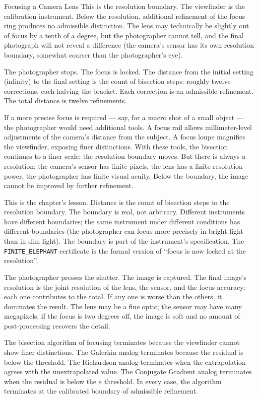 \begin{coda}{Focusing a Camera Lens}
This is the resolution boundary. The viewfinder is the
calibration instrument. Below the resolution, additional
refinement of the focus ring produces no admissible distinction.
The lens may technically be slightly out of focus by a tenth of
a degree, but the photographer cannot tell, and the final
photograph will not reveal a difference (the camera's sensor
has its own resolution boundary, somewhat coarser than the
photographer's eye).

The photographer stops. The focus is locked. The distance from
the initial setting (infinity) to the final setting is the
count of bisection steps: roughly twelve corrections, each
halving the bracket. Each correction is an admissible
refinement. The total distance is twelve refinements.

If a more precise focus is required --- say, for a macro shot
of a small object --- the photographer would need additional
tools. A focus rail allows millimeter-level adjustments of the
camera's distance from the subject. A focus loupe magnifies the
viewfinder, exposing finer distinctions. With these tools, the
bisection continues to a finer scale: the resolution boundary
moves. But there is always a resolution: the camera's sensor
has finite pixels, the lens has a finite resolution power, the
photographer has finite visual acuity. Below the boundary, the
image cannot be improved by further refinement.

This is the chapter's lesson. Distance is the count of
bisection steps to the resolution boundary. The boundary is
real, not arbitrary. Different instruments have different
boundaries; the same instrument under different conditions has
different boundaries (the photographer can focus more precisely
in bright light than in dim light). The boundary is part of
the instrument's specification. The
\texttt{FINITE\_ELEPHANT} certificate is the formal version of
``focus is now locked at the resolution''.

The photographer presses the shutter. The image is captured.
The final image's resolution is the joint resolution of the
lens, the sensor, and the focus accuracy: each one contributes
to the total. If any one is worse than the others, it
dominates the result. The lens may be a fine optic; the sensor
may have many megapixels; if the focus is two degrees off, the
image is soft and no amount of post-processing recovers the
detail.

The bisection algorithm of focusing terminates because the
viewfinder cannot show finer distinctions. The Galerkin
analog terminates because the residual is below the threshold.
The Richardson analog terminates when the extrapolation
agrees with the unextrapolated value. The Conjugate Gradient
analog terminates when the residual is below the
$\varepsilon$ threshold. In every case, the algorithm
terminates at the calibrated boundary of admissible
refinement.


\end{coda}
